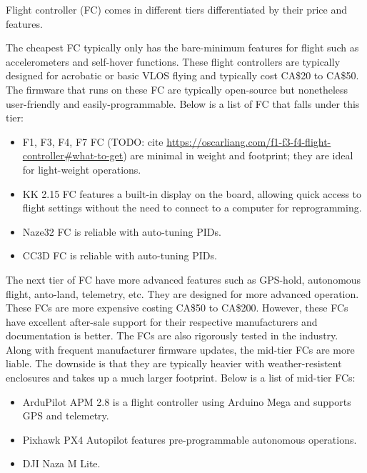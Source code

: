 Flight controller (FC) comes in different tiers differentiated by their price and features. 

The cheapest FC typically only has the bare-minimum features for flight such as accelerometers and 
self-hover functions. These flight controllers are typically designed for acrobatic or basic VLOS 
flying and typically cost CA\$20 to CA\$50. The firmware that runs on these FC are typically 
open-source but nonetheless user-friendly and easily-programmable. Below is a list of FC that falls 
under this tier:

\begin{itemize}[noitemsep,topsep=0pt, parsep=4pt, partopsep=0pt]
    \item F1, F3, F4, F7 FC (TODO: cite \url{https://oscarliang.com/f1-f3-f4-flight-controller#what-to-get}) are minimal in weight and footprint; they are ideal for light-weight operations.
    \item KK 2.15 FC features a built-in display on the board, allowing quick access to flight settings without the need to connect to a computer for reprogramming.
    \item Naze32 FC is reliable with auto-tuning PIDs.
    \item CC3D FC is reliable with auto-tuning PIDs.
\end{itemize}

The next tier of FC have more advanced features such as GPS-hold, autonomous flight, anto-land, 
telemetry, etc. They are designed for more advanced operation. These FCs are more expensive costing 
CA\$50 to CA\$200. However, these FCs have excellent after-sale support for their respective 
manufacturers and documentation is better. The FCs are also rigorously tested in the industry. Along 
with frequent manufacturer firmware updates, the mid-tier FCs are more liable. The downside is that 
they are typically heavier with weather-resistent enclosures and takes up a much larger footprint. 
Below is a list of mid-tier FCs:

\begin{itemize}[noitemsep,topsep=0pt, parsep=4pt, partopsep=0pt]
    \item ArduPilot APM 2.8 is a flight controller using Arduino Mega and supports GPS and telemetry.
    \item Pixhawk PX4 Autopilot features pre-programmable autonomous operations.
    \item DJI Naza M Lite.
\end{itemize}

